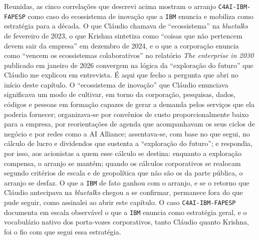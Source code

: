 Reunidas, as cinco correlações que descrevi acima mostram o arranjo \texttt{C4AI-IBM-FAPESP} como caso do ecossistema de inovação que a \texttt{IBM} enuncia e mobiliza como estratégia para a década. O que Cláudio chamava de \enquote{ecossistema} na \textit{bluetalks} de fevereiro de 2023, o que Krishna sintetiza como \enquote{coisas que não pertencem devem sair da empresa} em dezembro de 2024, e o que a corporação enuncia como \enquote{vencem os ecossistemas colaborativos} no relatório \textit{The enterprise in 2030} publicado em janeiro de 2026 convergem na lógica da \enquote{exploração do futuro} que Cláudio me explicou em entrevista. É aqui que fecho a pergunta que abri no início deste capítulo. O \enquote{ecossistema de inovação} que Cláudio enunciava significava um modo de cultivar, em torno da corporação, pesquisas, dados, códigos e pessoas em formação capazes de gerar a demanda pelos serviços que ela poderia fornecer; organizava-se por convênios de custo proporcionalmente baixo para a empresa, por reorientações de agenda que acompanhavam os seus ciclos de negócio e por redes como a AI Alliance; assentava-se, com base no que segui, no cálculo de lucro e dividendos que sustenta a \enquote{exploração do futuro}; e respondia, por isso, aos acionistas a quem esse cálculo se destina: enquanto a exploração compensa, o arranjo se mantém; quando os cálculos corporativos se realocam segundo critérios de escala e de geopolítica que não são os da parte pública, o arranjo se desfaz. O que a \texttt{IBM} de fato ganhou com o arranjo, e se o retorno que Cláudio antecipava na \textit{bluetalks} chegou a se confirmar, permanece fora do que pude seguir, como assinalei ao abrir este capítulo. O caso \texttt{C4AI-IBM-FAPESP} documenta em escala observável o que a \texttt{IBM} enuncia como estratégia geral, e o vocabulário nativo dos porta-vozes corporativos, tanto Cláudio quanto Krishna, foi o fio com que segui essa estratégia. %

